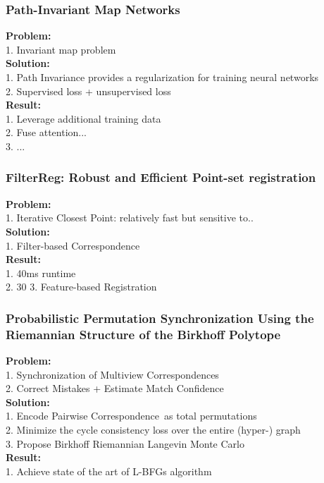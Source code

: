 \subsubsection{Path-Invariant Map Networks}
    {\bf Problem:} \\
        1. Invariant map problem \\
    {\bf Solution:} \\
        1. Path Invariance provides a regularization for training neural networks \\
        2. Supervised loss + unsupervised loss \\
    {\bf Result:} \\
        1. Leverage additional training data \\
        2. Fuse attention... \\
        3. ... \\
\subsubsection{FilterReg: Robust and Efficient Point-set registration}
    {\bf Problem:} \\
        1. Iterative Closest Point: relatively fast but sensitive to.. \\
    {\bf Solution:} \\
        1. Filter-based Correspondence \\
    {\bf Result:}  \\
        1. 40ms runtime \\
        2. 30%
        3. Feature-based Registration \\
\subsubsection{Probabilistic Permutation Synchronization Using the Riemannian Structure of the Birkhoff Polytope}
    {\bf Problem:} \\
        1. Synchronization of Multiview Correspondences \\
        2. Correct Mistakes + Estimate Match Confidence \\
    {\bf Solution:} \\
        1. Encode Pairwise Correspondence\ as total permutations \\
        2. Minimize the cycle consistency loss over the entire (hyper-) graph \\
        3. Propose Birkhoff Riemannian Langevin Monte Carlo \\
    {\bf Result:} \\
        1. Achieve state of the art of L-BFGs algorithm \\
